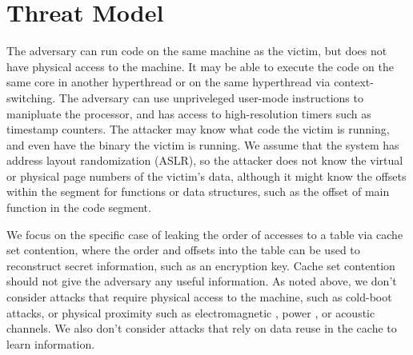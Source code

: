 \section{Threat Model}
The adversary can run code on the same machine as the victim, but does not have physical access to the machine. It may be able to execute the code on the same core in another hyperthread or on the same hyperthread via context-switching. The adversary can use unpriveleged user-mode instructions to manipluate the processor, and has access to high-resolution timers such as timestamp counters. The attacker may know what code the victim is running, and even have the binary the victim is running. We assume that the system has address layout randomization (ASLR), so the attacker does not know the virtual or physical page numbers of the victim's data, although it might know the offsets within the segment for functions or data structures, such as the offset of main function in the code segment. 

We focus on the specific case of leaking the order of accesses to a table via cache set contention, where the order and offsets into the table can be used to reconstruct secret information, such as an encryption key. Cache set contention should not give the adversary any useful information. As noted above, we don't consider attacks that require physical access to the machine, such as cold-boot attacks, or physical proximity such as electromagnetic \cite{nazari2017eddie}, power \cite{kocher1999differential}, or acoustic channels. We also don't consider attacks that rely on data reuse in the cache to learn information.  
